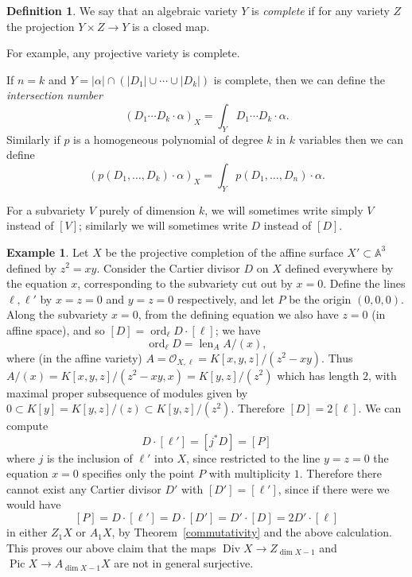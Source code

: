\documentclass[leqno, openany]{memoir}
\theoremstyle{definition}
\newtheorem{defn}[thm]{Definition}
\newtheorem{exm}[thm]{Example}
\theoremstyle{remark}
\theoremstyle{plain}
\theoremstyle{definition}
\theoremstyle{remark}
\newcommand{\A}{\mathbb{A}}
\newcommand{\msc}[1]{\mathscr{#1}}
\DeclareMathOperator{\Pic}{Pic}
\DeclareMathOperator{\ord}{ord}
\DeclareMathOperator{\Div}{Div}
\begin{document}
\begin{defn}
We say that an algebraic variety $Y$ is \textit{complete}  if for any variety $Z$ the projection $Y \times Z \to Y$ is a closed map.
\end{defn}
For example, any projective variety is complete.

If $n = k$ and $Y = |\alpha| \cap (|D_1| \cup \cdots \cup |D_k|)$ is complete, then we can define the \textit{intersection number} \[ (D_1 \cdots D_k \cdot \alpha)_X = \int_Y D_1 \cdots D_k \cdot \alpha . \] Similarly if $p$ is a homogeneous polynomial of degree $k$ in $k$ variables then we can define \[ (p(D_1, \ldots, D_k) \cdot \alpha)_X = \int_Y p(D_1, \ldots, D_n) \cdot \alpha . \]

For a subvariety $V$ purely of dimension $k$, we will sometimes write simply $V$ instead of $[V]$; similarly we will sometimes write $D$ instead of $[D]$.

\begin{exm}
    Let $X$ be the projective completion of the affine surface $X' \subset \A^3$ defined by $z^2 = xy$. Consider the Cartier divisor $D$ on $X$ defined everywhere by the equation $x$, corresponding to the subvariety cut out by $x = 0$. Define the lines $\ell, \ell'$ by $x = z = 0$ and $y = z = 0$ respectively, and let $P$ be the origin $(0,0,0)$. Along the subvariety $x = 0$, from the defining equation we also have $z = 0$ (in affine space), and so $[D] = \ord_\ell D \cdot [\ell]$; we have \[ \ord_\ell D = \operatorname{len}_A A/(x) , \] where (in the affine variety) $A = \msc{O}_{X,\ell} = K[x,y,z]/(z^2 - x y)$. Thus $A/(x) = K[x,y,z]/(z^2-xy,x) = K[y,z]/(z^2)$ which has length $2$, with maximal proper subsequence of modules given by $0 \subset K[y] = K[y,z]/(z) \subset K[y,z]/(z^2)$. Therefore $[D] = 2 [\ell]$.  We can compute \[ D \cdot [\ell'] = [j^* D] = [P] \] where $j$ is the inclusion of $\ell'$ into $X$, since restricted to the line $y = z = 0$ the equation $x=0$ specifies only the point $P$ with multiplicity $1$. Therefore there cannot exist any Cartier divisor $D'$ with $[D'] = [\ell']$, since if there were we would have \[ [P] = D \cdot [\ell'] = D \cdot [D'] = D' \cdot [D] = 2 D' \cdot [\ell] \] in either $Z_1 X$ or $A_1 X$, by Theorem~\ref{commutativity} and the above calculation. This proves our above claim that the maps $\Div X \to Z_{\dim X - 1}$ and $\Pic X \to A_{\dim X - 1} X$ are not in general surjective.
\end{exm}
\end{document}
